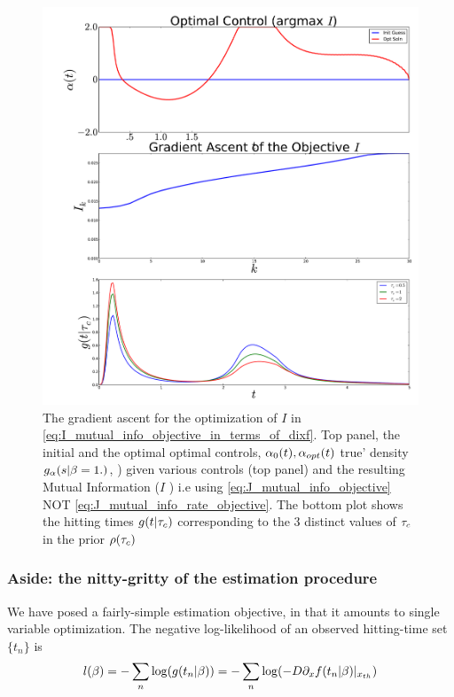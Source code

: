 \documentclass{article}
\begin{document}
\begin{figure}[htp] 
\begin{center}
  \includegraphics[width=1\textwidth]{Figs/FP_Adjoint/ExampleOptControl_MI_HT.pdf}
  \caption[labelInTOC]{The gradient ascent for the optimization of $I$ in
  \cref{eq:I_mutual_info_objective_in_terms_of_dixf}. Top panel, the initial and
  the optimal optimal controls, ${\alpha}_{0}(t), {\alpha}_{opt}(t)$
   true' density $
  g_{{\alpha}}(s|{\beta} = 1.)$, ) given various controls (top panel) and the resulting Mutual Information ($I$ ) i.e using \cref{eq:J_mutual_info_objective} NOT \cref{eq:J_mutual_info_rate_objective}.
  The bottom plot shows the hitting times $g(t| { \tau_{c} })$ corresponding to the 3
  distinct values of ${ \tau_{c} }$ in the prior $\rho({ \tau_{c} })$}
  \label{fig:hitting_time_density_g_aopt_bprior}  
\end{center}
\end{figure} 

\subsubsection{Aside: the nitty-gritty of the estimation procedure}
We have posed a fairly-simple estimation objective, in that it amounts to single
variable optimization. The negative log-likelihood of an observed hitting-time
set $\{t_n\}$ is
\begin{equation}
l({\beta}) = - \sum_n \log ( g(t_n | {\beta}) ) =  - \sum_n \log ( -D {\partial}_x f(t_n |
{\beta}) |_{{ x_{th} }} )
\end{equation}
\end{document}

